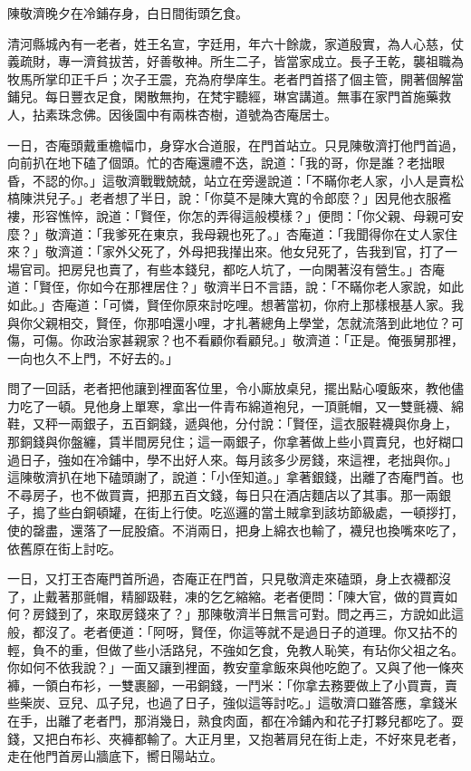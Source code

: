 陳敬濟晚夕在冷鋪存身，白日間街頭乞食。

清河縣城內有一老者，姓王名宣，字廷用，年六十餘歲，家道殷實，為人心慈，仗義疏財，專一濟貧拔苦，好善敬神。所生二子，皆當家成立。長子王乾，襲祖職為牧馬所掌印正千戶；次子王震，充為府學庠生。老者門首搭了個主管，開著個解當鋪兒。每日豐衣足食，閑散無拘，在梵宇聽經，琳宮講道。無事在家門首施藥救人，拈素珠念佛。因後園中有兩株杏樹，道號為杏庵居士。

一日，杏庵頭戴重檐幅巾，身穿水合道服，在門首站立。只見陳敬濟打他門首過，向前扒在地下磕了個頭。忙的杏庵還禮不迭，說道：「我的哥，你是誰？老拙眼昏，不認的你。」這敬濟戰戰兢兢，站立在旁邊說道：「不瞞你老人家，小人是賣松槁陳洪兒子。」老者想了半日，說：「你莫不是陳大寬的令郎麼？」因見他衣服襤褸，形容憔悴，說道：「賢侄，你怎的弄得這般模樣？」便問：「你父親、母親可安麼？」敬濟道：「我爹死在東京，我母親也死了。」杏庵道：「我聞得你在丈人家住來？」敬濟道：「家外父死了，外母把我攆出來。他女兒死了，告我到官，打了一場官司。把房兒也賣了，有些本錢兒，都吃人坑了，一向閑著沒有營生。」杏庵道：「賢侄，你如今在那裡居住？」敬濟半日不言語，說：「不瞞你老人家說，如此如此。」杏庵道：「可憐，賢侄你原來討吃哩。想著當初，你府上那樣根基人家。我與你父親相交，賢侄，你那咱還小哩，才扎著總角上學堂，怎就流落到此地位？可傷，可傷。你政治家甚親家？也不看顧你看顧兒。」敬濟道：「正是。俺張舅那裡，一向也久不上門，不好去的。」

問了一回話，老者把他讓到裡面客位里，令小廝放桌兒，擺出點心嗄飯來，教他儘力吃了一頓。見他身上單寒，拿出一件青布綿道袍兒，一頂氈帽，又一雙氈襪、綿鞋，又秤一兩銀子，五百銅錢，遞與他，分付說：「賢侄，這衣服鞋襪與你身上，那銅錢與你盤纏，賃半間房兒住；這一兩銀子，你拿著做上些小買賣兒，也好糊口過日子，強如在冷鋪中，學不出好人來。每月該多少房錢，來這裡，老拙與你。」這陳敬濟扒在地下磕頭謝了，說道：「小侄知道。」拿著銀錢，出離了杏庵門首。也不尋房子，也不做買賣，把那五百文錢，每日只在酒店麵店以了其事。那一兩銀子，搗了些白銅頓罐，在街上行使。吃巡邏的當土賊拿到該坊節級處，一頓拶打，使的罄盡，還落了一屁股瘡。不消兩日，把身上綿衣也輸了，襪兒也換嘴來吃了，依舊原在街上討吃。

一日，又打王杏庵門首所過，杏庵正在門首，只見敬濟走來磕頭，身上衣襪都沒了，止戴著那氈帽，精腳趿鞋，凍的乞乞縮縮。老者便問：「陳大官，做的買賣如何？房錢到了，來取房錢來了？」那陳敬濟半日無言可對。問之再三，方說如此這般，都沒了。老者便道：「阿呀，賢侄，你這等就不是過日子的道理。你又拈不的輕，負不的重，但做了些小活路兒，不強如乞食，免教人恥笑，有玷你父祖之名。你如何不依我說？」一面又讓到裡面，教安童拿飯來與他吃飽了。又與了他一條夾褲，一領白布衫，一雙裹腳，一弔銅錢，一鬥米：「你拿去務要做上了小買賣，賣些柴炭、豆兒、瓜子兒，也過了日子，強似這等討吃。」這敬濟口雖答應，拿錢米在手，出離了老者門，那消幾日，熟食肉面，都在冷鋪內和花子打夥兒都吃了。耍錢，又把白布衫、夾褲都輸了。大正月里，又抱著肩兒在街上走，不好來見老者，走在他門首房山牆底下，嚮日陽站立。

